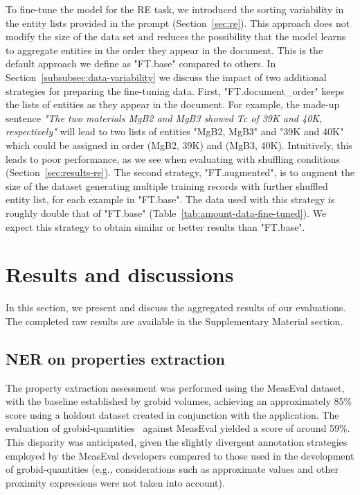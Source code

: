 To fine-tune the model for the RE task, we introduced the sorting variability in the entity lists provided in the prompt (Section~\ref{sec:re}). This approach does not modify the size of the data set and reduces the possibility that the model learns to aggregate entities in the order they appear in the document. This is the default approach we define as "FT.base" compared to others.
In Section~\ref{subsubsec:data-variability} we discuss the impact of two additional strategies for preparing the fine-tuning data. 
First, "FT.document\_order" keeps the lists of entities as they appear in the document. 
For example, the made-up sentence \textit{"The two materials MgB2 and MgB3 showed Tc of 39K and 40K, respectively"} will lead to two lists of entities "MgB2, MgB3" and "39K and 40K" which could be assigned in order (MgB2, 39K) and (MgB3, 40K).
Intuitively, this leads to poor performance, as we see when evaluating with shuffling conditions (Section~\ref{sec:results-re}). 
The second strategy, "FT.augmented", is to augment the size of the dataset generating multiple training records with further shuffled entity list, for each example in "FT.base". The data used with this strategy is roughly double that of "FT.base" (Table~\ref{tab:amount-data-fine-tuned}). We expect this strategy to obtain similar or better results than "FT.base". 

\section{Results and discussions}
\label{sec:results}
In this section, we present and discuss the aggregated results of our evaluations. The completed raw results are available in the Supplementary Material section. 

\subsection{NER on properties extraction}
\label{sec:results-ner-properties}

The property extraction assessment was performed using the MeasEval dataset, with the baseline established by grobid volumes, achieving an approximately 85\% score using a holdout dataset created in conjunction with the application. 
The evaluation of grobid-quantities~\cite{foppiano2019quantities} against MeasEval yielded a score of around 59\%. This disparity was anticipated, given the slightly divergent annotation strategies employed by the MeasEval developers compared to those used in the development of grobid-quantities (e.g., considerations such as approximate values and other proximity expressions were not taken into account). 

